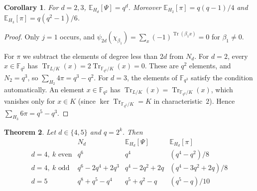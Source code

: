 \documentclass[11pt,a4paper]{amsart}
\newtheorem{theorem}{Theorem}[section]
\newtheorem{corollary}[theorem]{Corollary}
\theoremstyle{definition}
\theoremstyle{remark}
\newcommand{\F}{\mathbb{F}}
\newcommand{\Tr}{\operatorname{Tr}}
\newcommand{\E}{\mathbb{E}}
\begin{document}
\begin{corollary}\label{cor:d23}
For $d=2,3$, $\E_{H_d}[\Psi]=q^d$. Moreover $\E_{H_2}[\pi]=q(q-1)/4$ and $\E_{H_3}[\pi]=q(q^2-1)/6$.
\end{corollary}

\begin{proof}
Only $j=1$ occurs, and $\psi_{2d}(\chi_{\beta_1})=\sum_x(-1)^{\Tr(\beta_1x)}=0$ for $\beta_1\ne0$.

For $\pi$ we subtract the elements of degree less than $2d$ from $N_d$. For $d=2$, every $x\in\F_{q^2}$ has $\Tr_{L/K}(x)=2\Tr_{\F_{q^2}/K}(x)=0$. These are $q^2$ elements, and
$N_2=q^3$, so $\sum_{H_2}4\pi=q^3-q^2$. For $d=3$, the elements of $\F_{q^3}$ satisfy the condition automatically. An
element $x\in\F_{q^2}$ has $\Tr_{L/K}(x)=\Tr_{\F_{q^2}/K}(x)$, which vanishes only for $x\in K$ (since
$\ker\Tr_{\F_{q^2}/K}=K$ in characteristic~$2$). Hence
$\sum_{H_3}6\pi=q^5-q^3$.
\end{proof}

\begin{theorem}\label{thm:d45}
Let $d\in\{4,5\}$ and $q=2^k$. Then
\[
\begin{array}{c|c|c|c}
 & N_d & \E_{H_d}[\Psi] & \E_{H_d}[\pi]\\\hline
d=4,\ k\text{ even} & q^6 & q^4 & (q^4-q^2)/8\\
d=4,\ k\text{ odd} & q^6-2q^4+2q^3 & q^4-2q^2+2q & (q^4-3q^2+2q)/8\\
d=5 & q^8+q^5-q^4 & q^5+q^2-q & (q^5-q)/10
\end{array}
\]
\end{theorem}
\end{document}
